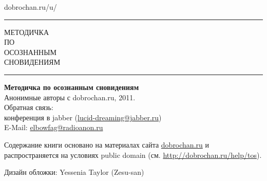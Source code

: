 
\begin{titlingpage}


\begin{center}

\hspace{1cm}

\begin{large}
\textsf{dobrochan.ru/u/}
\end{large}

\hspace{1cm}

\rule{6.5cm}{0.4mm}

 \begin{Huge}
   \fontsize{25}{30}\selectfont МЕТОДИЧКА\\ {\Large{ПО}}\\ ОСОЗНАННЫМ\\ СНОВИДЕНИЯМ\\
	\end{Huge}
    \normalsize

\rule{6.5cm}{0.4mm}


\vfill



\vfill







\end{center}

\newpage

\vspace*{\fill}

\begin{flushleft}
\begin{minipage}{0.85\textwidth}
\begin{flushleft}

\small
\textbf{Методичка по осознанным сновидениям}\\
Анонимные авторы с dobrochan.ru, 2011.\\
Обратная связь:\\ конференция в jabber (\url{lucid-dreaming@jabber.ru})\\
E-Mail: \url{elbowfag@radioanon.ru}\\

\medskip

Содержание книги основано на материалах сайта \url{dobrochan.ru} и распространяется на условиях public domain (см. \url{http://dobrochan.ru/help/tos}).

\medskip

Дизайн обложки: Yessenia Taylor (Zesu-san)\\

\normalsize

\end{flushleft}
\end{minipage}
\end{flushleft}

\end{titlingpage}

